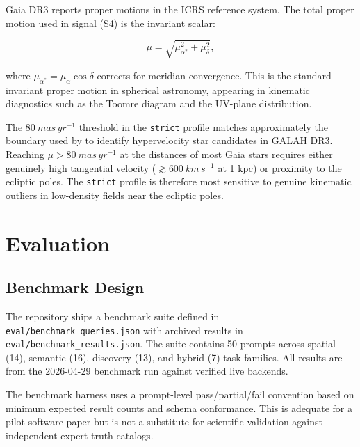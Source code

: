 \documentclass[12pt]{elsarticle}
\begin{document}
Gaia DR3 reports proper motions in the ICRS reference system. The total proper motion used in signal (S4) is the invariant scalar:

\begin{equation}
\mu = \sqrt{\mu_{\alpha^*}^2 + \mu_\delta^2},
\label{eq:pm}
\end{equation}

where $\mu_{\alpha^*} = \mu_\alpha \cos\delta$ corrects for meridian convergence. This is the standard invariant proper motion in spherical astronomy, appearing in kinematic diagnostics such as the Toomre diagram and the UV-plane distribution.

The $\SI{80}{mas\,yr^{-1}}$ threshold in the \texttt{strict} profile matches approximately the boundary used by \citet{Brown2015} to identify hypervelocity star candidates in GALAH DR3. Reaching $\mu > \SI{80}{mas\,yr^{-1}}$ at the distances of most Gaia stars requires either genuinely high tangential velocity ($\gtrsim \SI{600}{km\,s^{-1}}$ at 1 kpc) or proximity to the ecliptic poles. The \texttt{strict} profile is therefore most sensitive to genuine kinematic outliers in low-density fields near the ecliptic poles.

\section{Evaluation}
\label{sec:evaluation}

\subsection{Benchmark Design}
\label{sec:benchmark_design}

The repository ships a benchmark suite defined in \texttt{eval/benchmark\_queries.json} with archived results in \texttt{eval/benchmark\_results.json}. The suite contains 50 prompts across spatial (14), semantic (16), discovery (13), and hybrid (7) task families. All results are from the 2026-04-29 benchmark run against verified live backends.

The benchmark harness uses a prompt-level pass/partial/fail convention based on minimum expected result counts and schema conformance. This is adequate for a pilot software paper but is not a substitute for scientific validation against independent expert truth catalogs.
\end{document}
